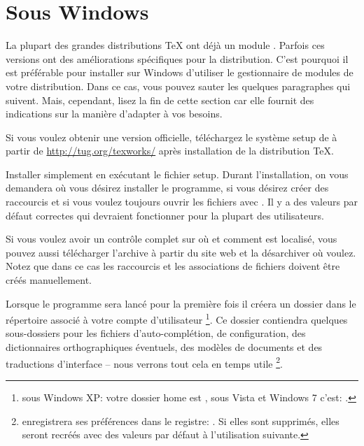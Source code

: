 \section{Sous Windows}

La plupart des grandes distributions \TeX{} ont déjà un module \Tw. Parfois ces versions ont des améliorations spécifiques pour la distribution. C'est pourquoi il est préférable pour installer \Tw{} sur Windows d'utiliser le gestionnaire de modules de votre distribution. Dans ce cas, vous pouvez sauter les quelques paragraphes qui suivent. Mais, cependant, lisez la fin de cette section car elle fournit des indications sur la manière d'adapter \Tw{} à vos besoins.

Si vous voulez obtenir une version \og officielle\fg, téléchargez le système setup de \Tw{} à partir de  \url{http://tug.org/texworks/}  après installation de la distribution \TeX.

Installer simplement \Tw{} en exécutant le fichier setup. Durant l'installation, on vous demandera où vous désirez installer le programme, si vous désirez créer des raccourcis et si vous voulez toujours ouvrir les fichiers  avec \Tw. Il y a des valeurs par défaut correctes qui devraient fonctionner pour la plupart des utilisateurs.

Si vous voulez avoir un contrôle complet sur où et comment \Tw{} est localisé, vous pouvez aussi télécharger l'archive  à partir du site web et la désarchiver où voulez. Notez que dans ce cas les raccourcis et les associations de fichiers doivent être créés manuellement.

\urldef{\TwRegistryPath}

Lorsque le programme sera lancé pour la première fois il créera un dossier  dans le répertoire associé à votre compte d'utilisateur \footnote{sous Windows XP: votre dossier home est , sous Vista et Windows 7 c'est: .}. Ce dossier contiendra quelques sous-dossiers pour les fichiers d'auto-complé\-tion, de configuration, des dictionnaires orthographiques éventuels, des modèles de documents et des traductions d'interface -- nous verrons tout cela en temps utile \footnote{\Tw{} enregistrera ses préférences dans le registre:
\TwRegistryPath. Si elles sont supprimés, elles seront recréés avec des valeurs par défaut à l'utilisation suivante.}.

